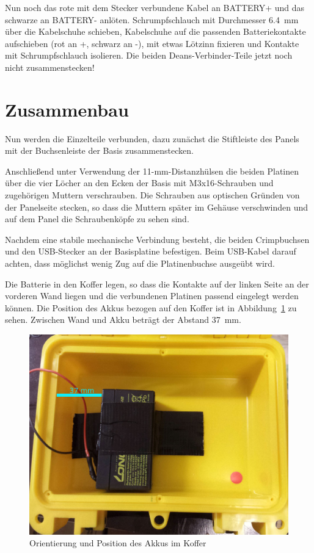 \documentclass[paper=a4, open=any]{scrbook}
\begin{document}
			Nun noch das rote mit dem Stecker verbundene Kabel an BATTERY+ und das schwarze an BATTERY- anlöten. Schrumpfschlauch mit Durchmesser \SI{6,4}{\milli\metre} über die Kabelschuhe schieben, Kabelschuhe auf die passenden Batteriekontakte aufschieben (rot an +, schwarz an -), mit etwas Lötzinn fixieren und Kontakte mit Schrumpfschlauch isolieren. Die beiden Deans-Verbinder-Teile jetzt noch nicht zusammenstecken!


		\section{Zusammenbau}
			Nun werden die Einzelteile verbunden, dazu zunächst die Stiftleiste des Panels mit der Buchsenleiste der Basis zusammenstecken.

			Anschließend unter Verwendung der 11-mm-Distanzhülsen die beiden Platinen über die vier Löcher an den Ecken der Basis mit M3x16-Schrauben und zugehörigen Muttern verschrauben. Die Schrauben aus optischen Gründen von der Panelseite stecken, so dass die Muttern später im Gehäuse verschwinden und auf dem Panel die Schraubenköpfe zu sehen sind.

			Nachdem eine stabile mechanische Verbindung besteht, die beiden Crimpbuchsen und den USB-Stecker an der Basisplatine befestigen. Beim USB-Kabel darauf achten, dass möglichst wenig Zug auf die Platinenbuchse ausgeübt wird.

			Die Batterie in den Koffer legen, so dass die Kontakte auf der linken Seite an der vorderen Wand liegen und die verbundenen Platinen passend eingelegt werden können. Die Position des Akkus bezogen auf den Koffer ist in Abbildung~\ref{fig:akkuposition} zu sehen. Zwischen Wand und Akku beträgt der Abstand \SI{37}{\milli\metre}.

			\begin{figure}
				\centering\includegraphics[width=.8\textwidth]{Akkuposition}
				\caption{Orientierung und Position des Akkus im Koffer}
				\label{fig:akkuposition}
			\end{figure}
\end{document}
